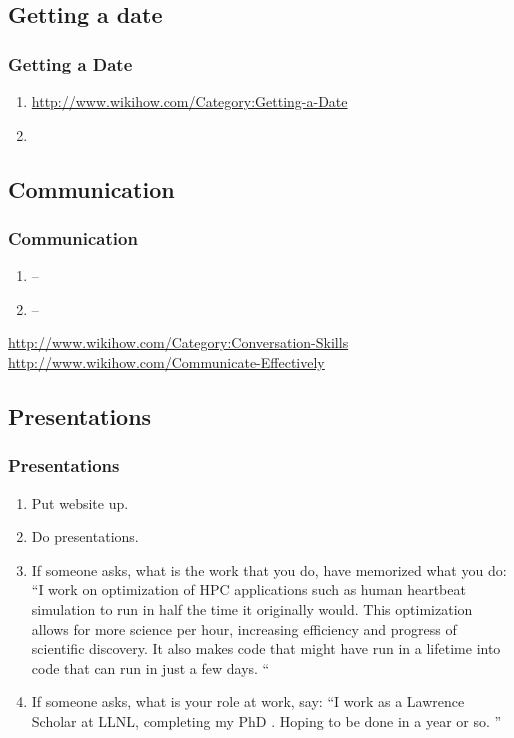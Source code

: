\subsection{Getting a date}
\begin{frame}
\frametitle{Getting a Date}
\begin{enumerate}
\item \small \url{ http://www.wikihow.com/Category:Getting-a-Date}
\item \tiny
\end{enumerate}
\end{frame}


\subsection{Communication}
\begin{frame} 
\frametitle{Communication}
\begin{enumerate} 
\item --
\item --
\end{enumerate}
\url{http://www.wikihow.com/Category:Conversation-Skills}
\url{http://www.wikihow.com/Communicate-Effectively}
\end{frame}

\subsection{Presentations}
\begin{frame} 
\frametitle{Presentations}
\begin{enumerate} 
\item \tiny Put website up. 
\item \tiny Do presentations. 
\item \tiny If someone asks, what is the work that you do, have memorized what 
you do: ``I work on optimization of HPC applications such as human heartbeat simulation to run in half the time it originally would. This optimization allows
for more science per hour, increasing efficiency and progress of scientific discovery. It also makes code that might have run in a lifetime into code that can run 
in just a few days. `` 
\item \tiny If someone asks, what is your role at work, say: ``I work as a Lawrence Scholar at LLNL, completing my PhD . Hoping to be done in a year or so. ''
\end{enumerate} 
\end{frame} 

